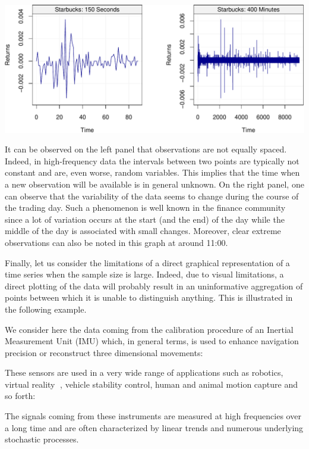 \documentclass[]{book}
\theoremstyle{definition}
\theoremstyle{definition}
\theoremstyle{definition}
\theoremstyle{remark}
\let\BeginKnitrBlock\begin \let\EndKnitrBlock\end
\begin{document}
\begin{center}\includegraphics{ts_files/figure-latex/example_Starbucks-1} \end{center}

It can be observed on the left panel that observations are not equally
spaced. Indeed, in high-frequency data the intervals between two points
are typically not constant and are, even worse, random variables. This
implies that the time when a new observation will be available is in
general unknown. On the right panel, one can observe that the
variability of the data seems to change during the course of the trading
day. Such a phenomenon is well known in the finance community since a
lot of variation occurs at the start (and the end) of the day while the
middle of the day is associated with small changes. Moreover, clear
extreme observations can also be noted in this graph at around 11:00.

\BeginKnitrBlock{example}
\protect\hypertarget{exm:imu}{}{\label{exm:imu} }Finally, let us consider
the limitations of a direct graphical representation of a time series
when the sample size is large. Indeed, due to visual limitations, a
direct plotting of the data will probably result in an uninformative
aggregation of points between which it is unable to distinguish
anything. This is illustrated in the following example.

We consider here the data coming from the calibration procedure of an
Inertial Measurement Unit (IMU) which, in general terms, is used to
enhance navigation precision or reconstruct three dimensional movements:
\EndKnitrBlock{example}

These sensors are used in a very wide range of applications such as
robotics, virtual reality 🐻, vehicle stability control, human and animal
motion capture and so forth:

The signals coming from these instruments are measured at high
frequencies over a long time and are often characterized by linear
trends and numerous underlying stochastic processes.
\end{document}
